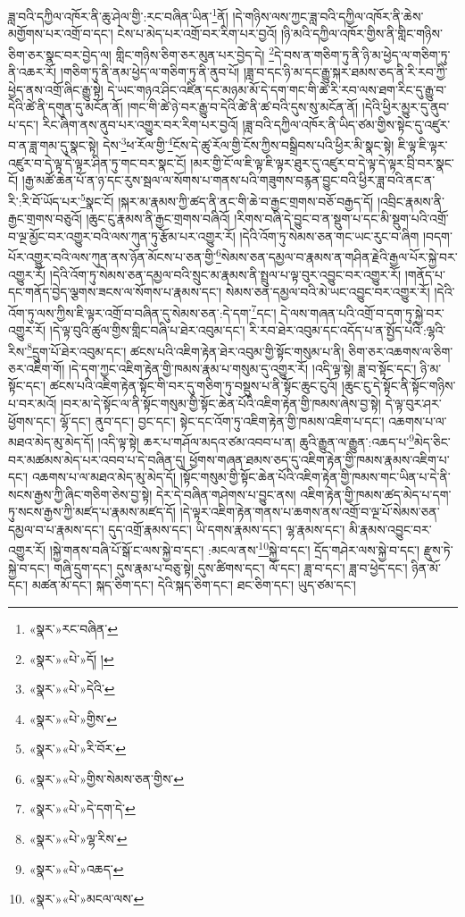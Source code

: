 ཟླ་བའི་དཀྱིལ་འཁོར་ནི་ཆུ་ཤེལ་གྱི་:རང་བཞིན་ཡིན་\footnote{«སྣར་»རང་བཞིན་}ནོ། །དེ་གཉིས་ལས་ཀྱང་ཟླ་བའི་དཀྱིལ་འཁོར་ནི་ཆེས་མགྱོགས་པར་འགྲོ་བ་དང་། ངེས་པ་མེད་པར་འགྲོ་བར་རིག་པར་བྱའོ། །ཉི་མའི་དཀྱིལ་འཁོར་གྱིས་ནི་གླིང་གཉིས་ཅིག་ཅར་སྣང་བར་བྱེད་ལ། གླིང་གཉིས་ཅིག་ཅར་མུན་པར་བྱེད་དེ། \footnote{«སྣར་»«པེ་»དོ། ། }དེ་བས་ན་གཅིག་ཏུ་ནི་ཉི་མ་ཕྱེད་ལ་གཅིག་ཏུ་ནི་འཆར་རོ། །གཅིག་ཏུ་ནི་ནམ་ཕྱེད་ལ་གཅིག་ཏུ་ནི་ནུབ་པོ། །ཟླ་བ་དང་ཉི་མ་དང་རྒྱུ་སྐར་ཐམས་ཅད་ནི་རི་རབ་ཀྱི་ཕྱེད་ནས་འགྲོ་ཞིང་རྒྱུ་སྟེ། དེ་ཡང་གཉའ་ཤིང་འཛིན་དང་མཉམ་མོ་དེ་དག་གང་གི་ཚེ་རི་རབ་ལས་ཐག་རིང་དུ་རྒྱུ་བ་དེའི་ཚེ་ནི་དགུན་དུ་མངོན་ནོ། །གང་གི་ཚེ་ཉེ་བར་རྒྱུ་བ་དེའི་ཚེ་ནི་ཚ་བའི་དུས་སུ་མངོན་ནོ། །དེའི་ཕྱིར་མྱུར་དུ་ནུབ་པ་དང་། རིང་ཞིག་ནས་ནུབ་པར་འགྱུར་བར་རིག་པར་བྱའོ། །ཟླ་བའི་དཀྱིལ་འཁོར་ནི་ཡིད་ཙམ་གྱིས་སྟེང་དུ་འཛུར་བ་ན་ཟླ་གམ་དུ་སྣང་སྟེ། དེས་\footnote{«སྣར་»«པེ་»དེའི་}ཕ་རོལ་གྱི་\footnote{«སྣར་»«པེ་»གྱིས་}ངོས་དེ་ཚུ་རོལ་གྱི་ངོས་ཀྱིས་བསྒྲིབས་པའི་ཕྱིར་མི་སྣང་སྟེ། ཇི་ལྟ་ཇི་ལྟར་འཛུར་བ་དེ་ལྟ་དེ་ལྟར་ཤིན་ཏུ་གང་བར་སྣང་ངོ། །མར་གྱི་ངོ་ལ་ཇི་ལྟ་ཇི་ལྟར་ཐུར་དུ་འཛུར་བ་དེ་ལྟ་དེ་ལྟར་བྲི་བར་སྣང་ངོ། །རྒྱ་མཚོ་ཆེན་པོ་ན་ཉ་དང་རུས་སྦལ་ལ་སོགས་པ་གནས་པའི་གཟུགས་བརྙན་བྱུང་བའི་ཕྱིར་ཟླ་བའི་ནང་ན་རི་:རི་བོ་ཡོད་པར་\footnote{«སྣར་»«པེ་»རི་བོར་}སྣང་ངོ། །སྐར་མ་རྣམས་ཀྱི་ཚད་ནི་ནང་གི་ཆེ་བ་རྒྱང་གྲགས་བཅོ་བརྒྱད་དོ། །འབྲིང་རྣམས་ནི་རྒྱང་གྲགས་བཅུའོ། །ཆུང་ངུ་རྣམས་ནི་རྒྱང་གྲགས་བཞིའོ། །རིགས་བཞི་དེ་བྱུང་བ་ན་སྡུག་པ་དང་མི་སྡུག་པའི་འགྲོ་བ་ལྔ་མྱོང་བར་འགྱུར་བའི་ལས་ཀུན་ཏུ་རྩོམ་པར་འགྱུར་རོ། །དེའི་འོག་ཏུ་སེམས་ཅན་གང་ཡང་རུང་བ་ཞིག །བདག་པོར་འགྱུར་བའི་ལས་ཀུན་ནས་ཉོན་མོངས་པ་ཅན་གྱི་\footnote{«སྣར་»«པེ་»གྱིས་སེམས་ཅན་གྱིས་}སེམས་ཅན་དམྱལ་བ་རྣམས་ན་གཤིན་རྗེའི་རྒྱལ་པོར་སྐྱེ་བར་འགྱུར་རོ། །དེའི་འོག་ཏུ་སེམས་ཅན་དམྱལ་བའི་སྲུང་མ་རྣམས་ནི་སྤྲུལ་པ་ལྟ་བུར་འབྱུང་བར་འགྱུར་རོ། །གནོད་པ་དང་གནོད་བྱེད་ལྕགས་ཟངས་ལ་སོགས་པ་རྣམས་དང་། སེམས་ཅན་དམྱལ་བའི་མེ་ཡང་འབྱུང་བར་འགྱུར་རོ། །དེའི་འོག་ཏུ་ལས་ཀྱིས་ཇི་ལྟར་འགྲོ་བ་བཞིན་དུ་སེམས་ཅན་:དེ་དག་\footnote{«སྣར་»«པེ་»དེ་དག་དེ་}དང་། དེ་ལས་གཞན་པའི་འགྲོ་བ་དག་ཏུ་སྐྱེ་བར་འགྱུར་རོ། །དེ་ལྟ་བུའི་ཚུལ་གྱིས་གླིང་བཞི་པ་ཐེར་འབུམ་དང་། རི་རབ་ཐེར་འབུམ་དང་འདོད་པ་ན་སྤྱོད་པའི་:ལྷའི་རིས་\footnote{«སྣར་»«པེ་»ལྷ་རིས་}དྲུག་པོ་ཐེར་འབུམ་དང་། ཚངས་པའི་འཇིག་རྟེན་ཐེར་འབུམ་གྱི་སྟོང་གསུམ་པ་ནི། ཅིག་ཅར་འཆགས་ལ་ཅིག་ཅར་འཇིག་གོ། །དེ་དག་ཀྱང་འཇིག་རྟེན་གྱི་ཁམས་རྣམ་པ་གསུམ་དུ་འགྱུར་རོ། །འདི་ལྟ་སྟེ། ཟླ་བ་སྟོང་དང་། ཉི་མ་སྟོང་དང་། ཚངས་པའི་འཇིག་རྟེན་སྟོང་གི་བར་དུ་གཅིག་ཏུ་བསྡུས་པ་ནི་སྟོང་ཆུང་ངུའོ། །ཆུང་ངུ་དེ་སྟོང་ནི་སྟོང་གཉིས་པ་བར་མའོ། །བར་མ་དེ་སྟོང་ལ་ནི་སྟོང་གསུམ་གྱི་སྟོང་ཆེན་པོའི་འཇིག་རྟེན་གྱི་ཁམས་ཞེས་བྱ་སྟེ། དེ་ལྟ་བུར་ཤར་ཕྱོགས་དང་། ལྷོ་དང་། ནུབ་དང་། བྱང་དང་། སྟེང་དང་འོག་ཏུ་འཇིག་རྟེན་གྱི་ཁམས་འཇིག་པ་དང་། འཆགས་པ་ལ་མཐའ་མེད་མུ་མེད་དོ། །འདི་ལྟ་སྟེ། ཆར་པ་གཤོལ་མདའ་ཙམ་འབབ་པ་ན། ཆུའི་རྒྱུན་ལ་རྒྱུན་:འཆད་པ་\footnote{«སྣར་»«པེ་»འཆད་}མེད་ཅིང་བར་མཚམས་མེད་པར་འབབ་པ་དེ་བཞིན་དུ། ཕྱོགས་གཞན་ཐམས་ཅད་དུ་འཇིག་རྟེན་གྱི་ཁམས་རྣམས་འཇིག་པ་དང་། འཆགས་པ་ལ་མཐའ་མེད་མུ་མེད་དོ། །སྟོང་གསུམ་གྱི་སྟོང་ཆེན་པོའི་འཇིག་རྟེན་གྱི་ཁམས་གང་ཡིན་པ་དེ་ནི་སངས་རྒྱས་ཀྱི་ཞིང་གཅིག་ཅེས་བྱ་སྟེ། དེར་དེ་བཞིན་གཤེགས་པ་བྱུང་ནས། འཇིག་རྟེན་གྱི་ཁམས་ཚད་མེད་པ་དག་ཏུ་སངས་རྒྱས་ཀྱི་མཛད་པ་རྣམས་མཛད་དོ། །དེ་ལྟར་འཇིག་རྟེན་གནས་པ་ཆགས་ནས་འགྲོ་བ་ལྔ་པོ་སེམས་ཅན་དམྱལ་བ་པ་རྣམས་དང་། དུད་འགྲོ་རྣམས་དང་། ཡི་དགས་རྣམས་དང་། ལྷ་རྣམས་དང་། མི་རྣམས་འབྱུང་བར་འགྱུར་རོ། །སྐྱེ་གནས་བཞི་པོ་སྒོ་ང་ལས་སྐྱེ་བ་དང་། :མངལ་ནས་\footnote{«སྣར་»«པེ་»མངལ་ལས་}སྐྱེ་བ་དང་། དྲོད་གཤེར་ལས་སྐྱེ་བ་དང་། རྫུས་ཏེ་སྐྱེ་བ་དང་། གཞི་དྲུག་དང་། དུས་རྣམ་པ་བཅུ་སྟེ། དུས་ཚིགས་དང་། ལོ་དང་། ཟླ་བ་དང་། ཟླ་བ་ཕྱེད་དང་། ཉིན་མོ་དང་། མཚན་མོ་དང་། སྐད་ཅིག་དང་། དེའི་སྐད་ཅིག་དང་། ཐང་ཅིག་དང་། ཡུད་ཙམ་དང་། 